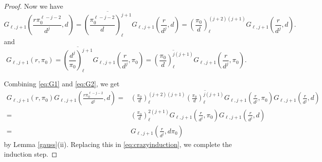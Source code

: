 \documentclass[12pt]{amsart}
\newcommand{\legl}[2]{\left( \frac{#1}{#2} \right)_\ell}
\begin{document}
\begin{proof}
Now we have 
\begin{equation}\label{eq:G1}
G_{\ell,j+1} \left( \frac{r\pi_0^{\ell-j-2}}{d^{j}} , d \right)=\overline{\legl{\pi_0^{\ell-j-2}}{d}^{j+1}} G_{\ell,j+1} \left( \frac{r}{d^{j}} , d \right)=\legl{\pi_0}{d}^{(j+2)(j+1)} G_{\ell,j+1} \left( \frac{r}{d^{j}} , d \right).
\end{equation}
and 
\begin{equation}\label{eq:G2}
G_{\ell, j+1}(r, \pi_0) =\overline{ \legl{d^j}{\pi_0}^{j+1}}
G_{\ell,j+1} \left( \frac{r}{d^{j}} , \pi_0 \right)=\overline{ \legl{\pi_0}{d}^{j(j+1)}}
G_{\ell,j+1} \left( \frac{r}{d^{j}} , \pi_0 \right).
\end{equation}

Combining \eqref{eq:G1} and \eqref{eq:G2}, we get 
\begin{align*}
 G_{\ell, j+1}(r, \pi_0) G_{\ell,j+1} \left( \frac{r\pi_0^{\ell-j-2}}{d^{j}} , d \right)=& \legl{\pi_0}{d}^{(j+2)(j+1)} \overline{ \legl{\pi_0}{d}^{j(j+1)}}
G_{\ell,j+1} \left( \frac{r}{d^{j}} , \pi_0 \right)G_{\ell,j+1} \left( \frac{r}{d^{j}} , d \right)\\
=&\legl{\pi_0}{d}^{2(j+1)} 
G_{\ell,j+1} \left( \frac{r}{d^{j}} , \pi_0 \right)G_{\ell,j+1} \left( \frac{r}{d^{j}} , d \right)\\
=&G_{\ell,j+1} \left( \frac{r}{d^{j}} , d\pi_0 \right)
\end{align*}
by Lemma \ref{gauss}(ii). Replacing this in \eqref{eq:crazyinduction}, we complete the induction step. 



\end{proof}
\end{document}
